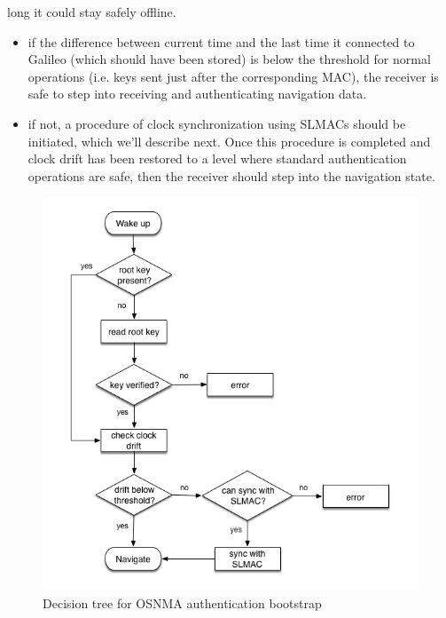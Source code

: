 \begin{itemize}
    long it could stay safely offline.
    \begin{itemize}
      \item if the difference between current time and the last time it
        connected to Galileo (which should have been stored) is below the
        threshold for normal operations (i.e. keys sent just after the
        corresponding MAC), the receiver is safe to step into receiving and
        authenticating navigation data.
      \item if not, a procedure of clock synchronization using SLMACs should be
        initiated, which we'll describe next. Once this procedure is completed
        and clock drift has been restored to a level where standard
        authentication operations are safe, then the receiver should step into
        the navigation state.
    \end{itemize}
\end{itemize}

\begin{figure}[h!]
  \includegraphics[width=\linewidth]{figures/flowchart_bootstrap.png}
  \caption{Decision tree for OSNMA authentication bootstrap}
  \label{fig:flowchart_boostrap}
\end{figure}

